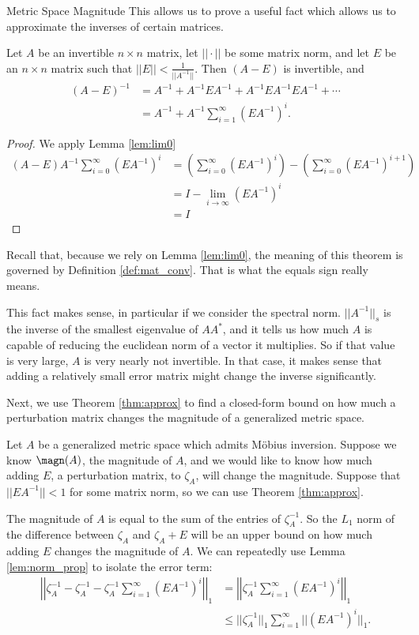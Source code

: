 \documentclass[12pt]{pom_thesis}
\begin{document}
\begin{chapter}{Metric Space Magnitude}
This allows us to prove a useful fact which allows us to approximate the inverses of certain matrices.
\begin{thm}\label{thm:approx}
Let $A$ be an invertible $n \times n$ matrix, let $||\cdot||$ be some matrix norm, and let $E$ be an $n \times n$ matrix such that $||E|| < \frac 1{||A^{-1}||}$. Then $(A-E)$ is invertible, and
\begin{align*}
(A - E)^{-1} &= A^{-1} + A^{-1}EA^{-1} + A^{-1}EA^{-1}EA^{-1} + \cdots\\
&= A^{-1} + A^{-1}\sum_{i = 1}^\infty (EA^{-1})^i.
\end{align*}
\end{thm}
\begin{proof}
We apply Lemma \ref{lem:lim0}
\begin{align*}
(A-E)  A^{-1}\sum_{i = 0}^\infty (EA^{-1})^i
&= \left(\sum_{i = 0}^\infty (EA^{-1})^i\right) - \left( \sum_{i = 0}^\infty (EA^{-1})^{i+1}\right)\\
&= I - \lim_{i \rightarrow \infty} (EA^{-1})^i\\
&= I
\end{align*}
\end{proof}
\begin{rmk}
Recall that, because we rely on Lemma \ref{lem:lim0}, the meaning of this theorem is governed by Definition \ref{def:mat_conv}. That is what the equals sign really means. 
\end{rmk}
This fact makes sense, in particular if we consider the spectral norm. $||A^{-1}||_s$ is the inverse of the smallest eigenvalue of $AA^*$, and it tells us how much $A$ is capable of reducing the euclidean norm of a vector it multiplies. So if that value is very large, $A$ is very nearly not invertible. In that case, it makes sense that adding a relatively small error matrix might change the inverse significantly. 

Next, we use Theorem \ref{thm:approx} to find a closed-form bound on how much a perturbation matrix changes the magnitude of a generalized metric space.

Let $A$ be a generalized metric space which admits M\"obius inversion. Suppose we know $\magn(A)$, the magnitude of $A$, and we would like to know how much adding $E$, a perturbation matrix, to $\zeta_A$, will change the magnitude. Suppose that $||EA^{-1}|| < 1$ for some matrix norm, so we can use Theorem \ref{thm:approx}.

The magnitude of $A$ is equal to the sum of the entries of $\zeta_A^{-1}$. So the $L_1$ norm of the difference between $\zeta_A$ and $\zeta_A + E$ will be an upper bound on how much adding $E$ changes the magnitude of $A$. We can repeatedly use Lemma \ref{lem:norm_prop} to isolate the error term:
\begin{align}
\left|\left|\zeta_A^{-1} - \zeta_A^{-1} - \zeta_A^{-1}\sum_{i = 1}^\infty (EA^{-1})^i\right|\right|_1 \nonumber 
&= \left|\left|\zeta_A^{-1}\sum_{i = 1}^\infty (EA^{-1})^i\right|\right|_1 \nonumber \\
&\leq ||\zeta_A^{-1}||_1\sum_{i = 1}^\infty ||(EA^{-1})^i||_1. \label{eq:series}
\end{align}


\end{chapter}
\end{document}
